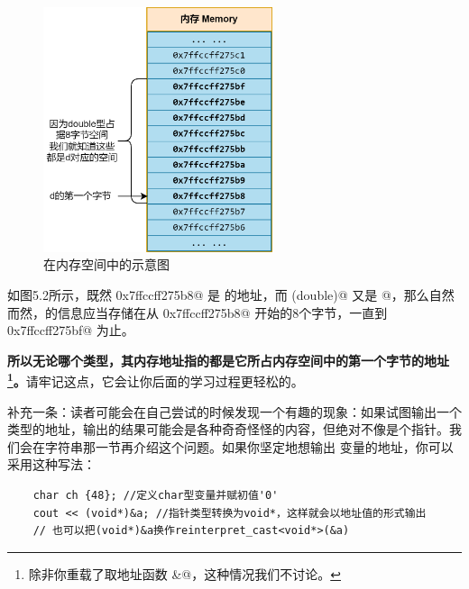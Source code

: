 \begin{figure}[htbp]
    \centering
    \includegraphics[width=0.6\textwidth]{../images/generalized_parts/05_address_of_types_in_memory_300.png}
    \caption{\lstinline@d@ 在内存空间中的示意图}
\end{figure}
如图5.2所示，既然 \lstinline@0x7ffccff275b8@ 是 \lstinline@d@ 的地址，而 \lstinline@sizeof(double)@ 又是 @，那么自然而然，\lstinline@d@ 的信息应当存储在从 \lstinline@0x7ffccff275b8@ 开始的8个字节，一直到 \lstinline@0x7ffccff275bf@ 为止。\par
\textbf{所以无论哪个类型，其内存地址指的都是它所占内存空间中的第一个字节的地址\footnote{除非你重载了取地址函数 \lstinline@&@，这种情况我们不讨论。}。}请牢记这点，它会让你后面的学习过程更轻松的。\par
补充一条：读者可能会在自己尝试的时候发现一个有趣的现象：如果试图输出一个 \lstinline@char@ 类型的地址，输出的结果可能会是各种奇奇怪怪的内容，但绝对不像是个指针。我们会在字符串那一节再介绍这个问题。如果你坚定地想输出 \lstinline@char@ 变量的地址，你可以采用这种写法：
\begin{lstlisting}
    char ch {48}; //定义char型变量并赋初值'0'
    cout << (void*)&a; //指针类型转换为void*，这样就会以地址值的形式输出
    // 也可以把(void*)&a换作reinterpret_cast<void*>(&a)
\end{lstlisting}
